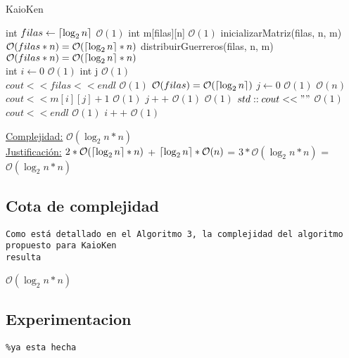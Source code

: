 \documentclass[10pt,a4paper]{article}
\DeclarePairedDelimiter\ceil{\lceil}{\rceil}
\begin{document}
\begin{algorithm}
\caption{KaioKen}
\begin{algorithmic}
	\State int $filas \gets \ceil*{\log_2 n}$ \Comment $\mathcal{O}(1)$
	\State int m[filas][n] \Comment $\mathcal{O}(1)$
	\State inicializarMatriz(filas, n, m) \Comment $\mathcal{O}(filas*n) = \mathcal{O}(\ceil*{\log_2 n}*n)$
	\State distribuirGuerreros(filas, n, m) \Comment $\mathcal{O}(filas*n) = \mathcal{O}(\ceil*{\log_2 n}*n)$
	\\
	\State int $i \gets 0$ \Comment $\mathcal{O}(1)$
	\State int j \Comment $\mathcal{O}(1)$
	\\
	\State $cout << filas << endl$ \Comment $\mathcal{O}(1)$
	 \Comment $\mathcal{O}(filas) = \mathcal{O}(\ceil*{\log_2 n})$
		\State $j \gets 0$ \Comment $\mathcal{O}(1)$
		 \Comment $\mathcal{O}(n)$
			\State $cout << m[i][j]+1$ \Comment $\mathcal{O}(1)$
			\State $j++$ \Comment $\mathcal{O}(1)$
			 \Comment $\mathcal{O}(1)$
				\State $std::cout << " "$ \Comment $\mathcal{O}(1)$
			\EndIf
		\EndWhile
		\State $cout << endl$ \Comment $\mathcal{O}(1)$
		\State $i++$ \Comment $\mathcal{O}(1)$
	\EndWhile
\EndFunction
\end{algorithmic}
\underline{Complejidad:} $\mathcal{O}(\log _{2} n * n)$\\
    \underline{Justificación:} $ 2 * \mathcal{O}(\ceil*{\log_2 n}*n)$ + $ \ceil*{\log_2 n} * \mathcal{O}(n)$ = $3*\mathcal{O}(\log _{2} n * n)$ = $\mathcal{O}(\log _{2} n * n)$\\
\end{algorithm}


\newpage
\subsection{Cota de complejidad}
\begin{verbatim}
Como está detallado en el Algoritmo 3, la complejidad del algoritmo propuesto para KaioKen
resulta
\end{verbatim}
$\mathcal{O}(\log _{2} n * n)$\\

\subsection{Experimentacion}
\begin{verbatim}
%ya esta hecha
\end{verbatim}
\end{document}
